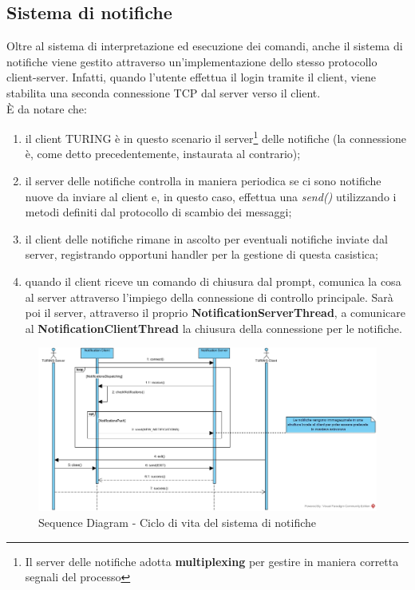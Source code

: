 \subsection{Sistema di notifiche}
Oltre al sistema di interpretazione ed esecuzione dei comandi, anche il sistema di notifiche viene gestito attraverso un'implementazione dello stesso protocollo client-server. Infatti, quando l'utente effettua il login tramite il client, viene stabilita una seconda connessione TCP dal server verso il client.\\ È da notare che:
\begin{enumerate}
	\item il client TURING è in questo scenario il server\footnote{Il server delle notifiche adotta \textbf{multiplexing} per gestire in maniera corretta segnali del processo} delle notifiche (la connessione è, come detto precedentemente, instaurata al contrario);
	\item il server delle notifiche controlla in maniera periodica se ci sono notifiche nuove da inviare al client e, in questo caso, effettua una \textit{send()} utilizzando i metodi definiti dal protocollo di scambio dei messaggi;
	\item il client delle notifiche rimane in ascolto per eventuali notifiche inviate dal server, registrando opportuni handler per la gestione di questa casistica;
	\item quando il client riceve un comando di chiusura dal prompt, comunica la cosa al server attraverso l'impiego della connessione di controllo principale. Sarà poi il server, attraverso il proprio \textbf{NotificationServerThread}, a comunicare al \textbf{NotificationClientThread} la chiusura della connessione per le notifiche.
\end{enumerate}

\begin{figure}[h]
	\caption{Sequence Diagram - Ciclo di vita del sistema di notifiche }
	\includegraphics[scale=0.4]{assets/notification_lifec-ycle}
\end{figure}
